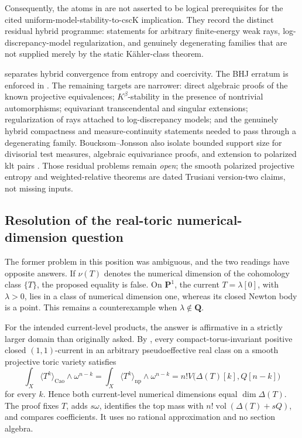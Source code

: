 Consequently, the atoms in  are not asserted
to be logical prerequisites for the cited uniform-model-stability-to-cscK
implication.  They record the distinct residual hybrid programme: statements
for arbitrary finite-energy weak rays, log-discrepancy-model regularization,
and genuinely degenerating families that are not supplied merely by the
static Kähler-class theorem.

 separates hybrid convergence from
entropy and coercivity.  The BHJ erratum is enforced in
.  The remaining targets are narrower: direct
algebraic proofs of the known projective equivalences; \(K^\beta\)-stability
in the presence of nontrivial automorphisms; equivariant transcendental and
singular extensions; regularization of rays attached to log-discrepancy
models; and the genuinely hybrid compactness and measure-continuity
statements needed to pass through a degenerating family.  Boucksom--Jonsson
also isolate bounded support size for divisorial test measures, algebraic
equivariance proofs, and extension to polarized klt pairs
\cite[Questions and further remarks]{BJ25WeightedYTD}.  Those residual
problems remain \emph{open}; the smooth polarized projective entropy and
weighted-relative theorems are dated Trusiani version-two claims, not
missing inputs.

\subsection{Resolution of the real-toric numerical-dimension question}
\label{sec:ch72-toric-dimension-resolved}

The former problem in this position was ambiguous, and the two readings have
opposite answers.  If \(\nu(T)\) denotes the numerical dimension of the
cohomology class \(\{T\}\), the proposed equality is false.  On
\(\mathbf P^1\), the current \(T=\lambda[0]\), with
\(\lambda>0\), lies in a class of numerical dimension one, whereas its
closed Newton body is a point.  This remains a counterexample when
\(\lambda\notin\mathbf Q\).

For the intended current-level products, the answer is affirmative in a
strictly larger domain than originally asked.  By
, every compact-torus-invariant positive
closed \((1,1)\)-current in an arbitrary pseudoeffective real class on a
smooth projective toric variety satisfies
\[
 \int_X\langle T^k\rangle_{\mathrm{Cao}}\wedge\omega^{n-k}
 =\int_X\langle T^k\rangle_{\mathrm{np}}\wedge\omega^{n-k}
 =n!V\bigl(\Delta(T)[k],Q[n-k]\bigr)
\]
for every \(k\).  Hence both current-level numerical dimensions equal
\(\dim\Delta(T)\).  The proof fixes \(T\), adds \(s\omega\), identifies the
top mass with \(n!\operatorname{vol}(\Delta(T)+sQ)\), and compares
coefficients.  It uses no rational approximation and no section algebra.

